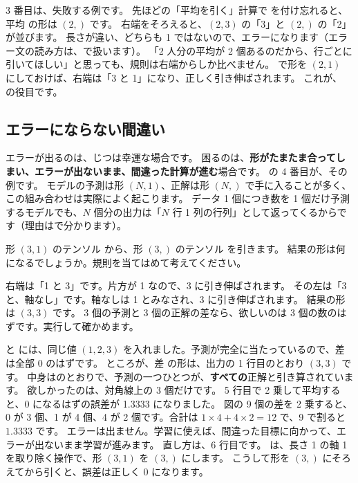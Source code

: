 3 番目は、失敗する例です。
先ほどの「平均を引く」計算で  を付け忘れると、平均  の形は $(2,)$ です。
右端をそろえると、$(2,3)$ の「3」と $(2,)$ の「2」が並びます。
長さが違い、どちらも 1 ではないので、エラーになります（エラー文の読み方は、で扱います）。
「2 人分の平均が 2 個あるのだから、行ごとに引いてほしい」と思っても、規則は右端からしか比べません。
 で形を $(2,1)$ にしておけば、右端は「3 と 1」になり、正しく引き伸ばされます。
これが、 の役目です。

\subsection*{エラーにならない間違い}

エラーが出るのは、じつは幸運な場合です。
困るのは、\textbf{形がたまたま合ってしまい、エラーが出ないまま、間違った計算が進む}場合です。
の 4 番目が、その例です。
モデルの予測は形 $(N,1)$、正解は形 $(N,)$ で手に入ることが多く、この組み合わせは実際によく起こります。
データ 1 個につき数を 1 個だけ予測するモデルでも、$N$ 個分の出力は「$N$ 行 1 列の行列」として返ってくるからです（理由はで分かります）。

\begin{quiz}
形 $(3,1)$ のテンソル  から、形 $(3,)$ のテンソル  を引きます。
結果の形は何になるでしょうか。規則を当てはめて考えてください。
\end{quiz}

右端は「1 と 3」です。片方が 1 なので、3 に引き伸ばされます。
その左は「3 と、軸なし」です。軸なしは 1 とみなされ、3 に引き伸ばされます。
結果の形は $(3,3)$ です。
3 個の予測と 3 個の正解の差なら、欲しいのは 3 個の数のはずです。実行して確かめます。



 と  には、同じ値 $(1,2,3)$ を入れました。予測が完全に当たっているので、差は全部 0 のはずです。
ところが、差  の形は、出力の 1 行目のとおり $(3,3)$ です。
中身はのとおりで、予測の一つひとつが、\textbf{すべての}正解と引き算されています。
欲しかったのは、対角線上の 3 個だけです。
5 行目で 2 乗して平均すると、0 になるはずの誤差が 1.3333 になりました。
図の 9 個の差を 2 乗すると、0 が 3 個、1 が 4 個、4 が 2 個です。合計は $1\times 4+4\times 2=12$ で、9 で割ると $1.3333$ です。
エラーは出ません。学習に使えば、間違った目標に向かって、エラーが出ないまま学習が進みます。
直し方は、6 行目です。 は、長さ 1 の軸 1 を取り除く操作で、形 $(3,1)$ を $(3,)$ にします。
こうして形を $(3,)$ にそろえてから引くと、誤差は正しく 0 になります。


